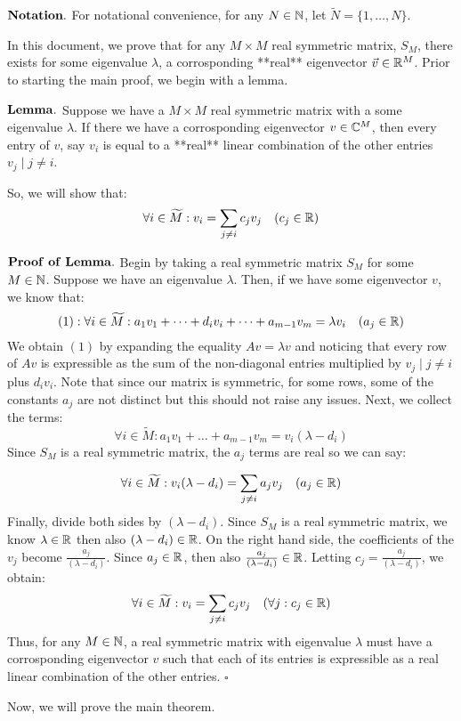 $\bf Notation.$ For notational convenience, for any $N \in \mathbb{N}$, let $\widetilde{N} = \{1,\dots,N\}$.

In this document, we prove that for any $M \times M$ real symmetric matrix, $S_M$, there exists for some eigenvalue $\lambda$, a corrosponding **real** eigenvector $\vec{v} \in \mathbb{R}^M$. Prior to starting the main proof, we begin with a lemma.

$\bf Lemma.$ Suppose we have a $M \times M$ real symmetric matrix with a some eigenvalue $\lambda$. If there we have a corrosponding eigenvector $v \in \mathbb{C}^M$, then every entry of $v$, say $v_i$ is equal to a **real** linear combination of the other entries $v_j \mid j \neq i$. 

So, we will show that:
$$\forall i \in \widetilde{M}: v_i =  {\sum_{j \neq i} c_j v_j} \quad (c_j \in \mathbb{R})$$

$\bf Proof \,\,of\,\, Lemma.$ Begin by taking a real symmetric matrix $S_M$ for some $M \in \mathbb{N}$. Suppose we have an eigenvalue $\lambda$. Then, if we have some eigenvector $v$, we know that:
$$(1): \forall i \in \widetilde{M} : a_1v_1 + \dots + d_iv_i + \dots + a_{m-1}v_m = \lambda v_i \quad ( a_j \in \mathbb{R})$$
We obtain $(1)$ by expanding the equality $Av = \lambda v$ and noticing that every row of $Av$ is expressible as the sum of the non-diagonal entries multiplied by $v_j \mid j \neq i$ plus $d_i v_i$. Note that since our matrix is symmetric, for some rows, some of the constants $a_j$ are not distinct but this should not raise any issues. Next, we collect the terms:
$$\forall i \in \widetilde{M} : a_1v_1 + \dots + a_{m-1}v_m =  v_i(\lambda - d_i)$$
Since $S_M$ is a real symmetric matrix, the $a_j$ terms are real so we can say:

$$\forall i \in \widetilde{M} :  v_i(\lambda - d_i) = \sum_{j \neq i} a_jv_j \quad (a_j \in \mathbb{R})$$
Finally, divide both sides by $(\lambda - d_i)$. Since $S_M$ is a real symmetric matrix, we know $\lambda \in \mathbb{R}$ then also $(\lambda - d_i) \in \mathbb{R}$. On the right hand side, the coefficients of the $v_j$ become $\frac{a_j}{(\lambda - d_i)}$. Since $a_j \in \mathbb{R}$, then also $\frac{a_j}{(\lambda - d_i)} \in \mathbb{R}$. Letting $c_j = \frac{a_j}{(\lambda - d_i)}$, we obtain:
$$\forall i \in \widetilde{M}: v_i =  {\sum_{j \neq i} c_j v_j} \quad (\forall j: c_j \in \mathbb{R})$$
Thus, for any $M \in \mathbb{N}$, a real symmetric matrix with eigenvalue $\lambda$ must have a corrosponding eigenvector $v$ such that each of its entries is expressible as a real linear combination of the other entries. $\square$

Now, we will prove the main theorem.

